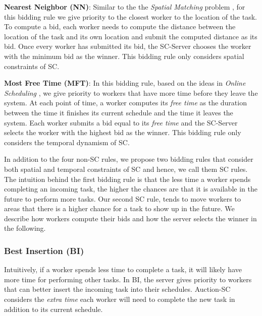 \noindent\textbf{Nearest Neighbor (NN)}:
Similar to the the \emph{Spatial Matching} problem \cite{Wong07}, for this bidding rule we give priority to the closest worker to the location of the task. To compute a bid, each worker needs to compute the distance between the location of the task and its own location and submit the computed distance as its bid. Once every worker has submitted its bid, the SC-Server chooses the worker with the minimum bid as the winner. This bidding rule only considers spatial constraints of SC.

\noindent\textbf{Most Free Time (MFT)}:
In this bidding rule, based on the ideas in \emph{Online Scheduling} \cite{Lee13}, we give priority to workers that have more time before they leave the system. At each point of time, a worker computes its \emph{free time} as the duration between the time it finishes its current schedule and the time it leaves the system. Each worker submits a bid equal to its \emph{free time} and the SC-Server selects the worker with the highest bid as the winner. This bidding rule only considers the temporal dynamism of SC.
 
In addition to the four non-SC rules, we propose two bidding rules that consider both spatial and temporal constraints of SC and hence, we call them SC rules. The intuition behind the first bidding rule is that the less time a worker spends completing an incoming task, the higher the chances are that it is available in the future to perform more tasks. Our second SC rule, tends to move workers to areas that there is a higher chance for a task to show up in the future. We describe how workers compute their bids and how the server selects the winner in the following.

\subsubsection{Best Insertion (BI)}

Intuitively, if a worker spends less time to complete a task, it will likely have more time for performing other tasks. In BI, the server gives priority to workers that can better insert the incoming task into their schedules. Auction-SC considers the \textit{extra time} each worker will need to complete the new task in addition to its current schedule.

